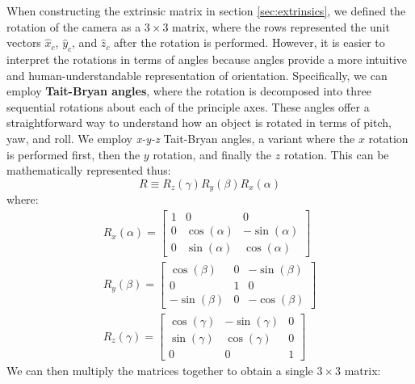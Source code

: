 When constructing the extrinsic matrix in section \ref{sec:extrinsics}, we defined the rotation of the camera as a $3 \times 3$ matrix, where the rows represented the unit vectors $\hat{x}_c$, $\hat{y}_c$, and $\hat{z}_c$ after the rotation is performed. However, it is easier to interpret the rotations in terms of angles because angles provide a more intuitive and human-understandable representation of orientation. Specifically, we can employ \textbf{Tait-Bryan angles}, where the rotation is decomposed into three sequential rotations about each of the principle axes. These angles offer a straightforward way to understand how an object is rotated in terms of pitch, yaw, and roll. We employ \emph{x-y-z} Tait-Bryan angles, a variant where the $x$ rotation is performed first, then the $y$ rotation, and finally the $z$ rotation. This can be mathematically represented thus:
\begin{equation}
    R \equiv R_z(\gamma)R_y(\beta)R_x(\alpha)
\end{equation}
where:
\begin{subequations}
    \begin{gather}
        R_x(\alpha) =
        \begin{bmatrix}
            1 & 0            & 0             \\
            0 & \cos(\alpha) & -\sin(\alpha) \\
            0 & \sin(\alpha) & \cos(\alpha)
        \end{bmatrix} \\
        R_y(\beta) =
        \begin{bmatrix}
            \cos(\beta)  & 0 & -\sin(\beta) \\
            0            & 1 & 0            \\
            -\sin(\beta) & 0 & -\cos(\beta)
        \end{bmatrix} \\
        R_z(\gamma) =
        \begin{bmatrix}
            \cos(\gamma) & -\sin(\gamma) & 0 \\
            \sin(\gamma) & \cos(\gamma)  & 0 \\
            0            & 0             & 1
        \end{bmatrix}
    \end{gather}
\end{subequations}
We can then multiply the matrices together to obtain a single $3 \times 3$ matrix:
